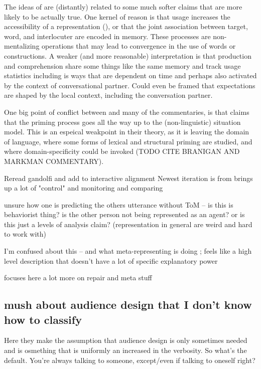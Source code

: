 \documentclass[]{article}
\begin{document}
The ideas of \cite{pickering2004} are (distantly) related to some much softer claims that are more likely to be actually true. One kernel of reason is that usage increases the accessibility of a representation (\cite{macdonald1994}), or that the joint association between target, word, and interlocuter are encoded in memory. These processes are non-mentalizing operations that may lead to convergence in the use of words or constructions. A weaker (and more reasonable) interpretation is that production and comprehension share some things like the same memory and track usage statistics including is ways that are dependent on time and perhaps also activated by the context of conversational partner.  Could even be framed that expectations are shaped by the local context, including the conversation partner. 

One big point of conflict between \cite{pickering2004} and many of the commentaries, is that \cite{pickering2004} claims that the priming process goes all the way up to the (non-linguistic) situation model. This is an espeical weakpoint in their theory, as it is leaving the domain of language, where some forms of lexical and structural priming are studied, and where domain-specificity could be invoked (TODO CITE BRANIGAN AND MARKMAN COMMENTARY). 

Reread gandolfi and add to interactive alignment
Newest iteration is from \cite{gandolfi2022} brings up a lot of "control" and monitoring and comparing 

unsure how one is predicting the others utterance without ToM -- is this is behaviorist thing? is the other person not being represented as an agent? or is this just a levels of analysis claim? (representation in general are weird and hard to work with)

I'm confused about this -- and what meta-representing is doing ; feels like a high level description that doesn't have a lot of specific explanatory power

focuses here a lot more on repair and meta stuff 


\subsection{mush about audience design that I don't know how to classify}

\cite{horton2002a} Here they make the assumption that audience design is only sometimes needed and is osmething that is uniformly an increased in the verbosity. So what's the default. You're always talking to someone, except/even if talking to oneself right? 
\end{document}
